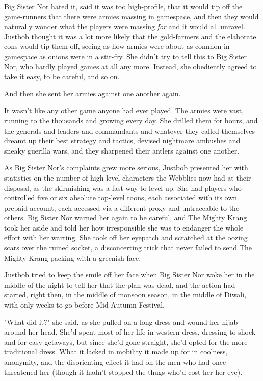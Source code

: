 Big Sister Nor hated it, said it was too high-profile, that it
would tip off the game-runners that there were armies massing in
gamespace, and then they would naturally wonder what the players
were massing \emph{for} and it would all unravel. Justbob thought
it was a lot more likely that the gold-farmers and the elaborate
cons would tip them off, seeing as how armies were about as common
in gamespace as onions were in a stir-fry. She didn't try to tell
this to Big Sister Nor, who hardly played games at all any more.
Instead, she obediently agreed to take it easy, to be careful, and
so on.

And then she sent her armies against one another again.

It wasn't like any other game anyone had ever played. The armies
were vast, running to the thousands and growing every day. She
drilled them for hours, and the generals and leaders and
commandants and whatever they called themselves dreamt up their
best strategy and tactics, devised nightmare ambushes and sneaky
guerilla wars, and they sharpened their antlers against one
another.

As Big Sister Nor's complaints grew more serious, Justbob presented
her with statistics on the number of high-level characters the
Webblies now had at their disposal, as the skirmishing was a fast
way to level up. She had players who controlled five or six
absolute top-level toons, each associated with its own prepaid
account, each accessed via a different proxy and untraceable to the
others. Big Sister Nor warned her again to be careful, and The
Mighty Krang took her aside and told her how irresponsible she was
to endanger the whole effort with her warring. She took off her
eyepatch and scratched at the oozing scars over the ruined socket,
a disconcerting trick that never failed to send The Mighty Krang
packing with a greenish face.

Justbob tried to keep the smile off her face when Big Sister Nor
woke her in the middle of the night to tell her that the plan was
dead, and the action had started, right then, in the middle of
monsoon season, in the middle of Diwali, with only weeks to go
before Mid-Autumn Festival.

"What did it?" she said, as she pulled on a long dress and wound
her hijab around her head. She'd spent most of her life in western
dress, dressing to shock and for easy getaways, but since she'd
gone straight, she'd opted for the more traditional dress. What it
lacked in mobility it made up for in coolness, anonymity, and the
disorienting effect it had on the men who had once threatened her
(though it hadn't stopped the thugs who'd cost her her eye).

